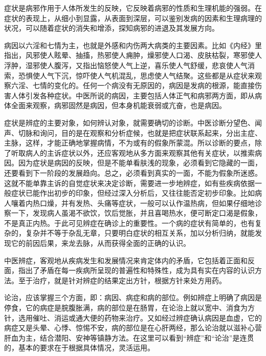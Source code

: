 \documentclass[12pt,UTF8]{ctexbook}
\begin{document}
症状是病邪作用于人体所发生的反映，它反映着病邪的性质和生理机能的强弱。在症状的表现上，从细小到显露，从表面到深层，可以鉴别发病的因素和生理病理的状况，可以随着症状的消失和增添，探知病邪的进退及其发展方向。

病因以六淫和七情为主，也就是外感和内伤两大病类的主要因素。比如《内经》里指出，风邪使人眩晕、抽搐，热邪使人痈肿，燥邪使人口渴、皮肤枯裂，寒邪使人浮肿，湿邪使人腹泻，又指出恼怒使人气上逆，喜乐使人气舒缓，悲哀使人气消索，恐惧使人气下沉，惊吓使人气机混乱，思虑使人气结聚。这些都是从症状来观察六淫、七情的变化的。任何一个病没有无原因的，病因是发病的根源，能直接伤害人体引发各种症状。中医所说的病因，主要包括人体正气和病邪两方面，即从病体全面来观察，病邪固然是病因，但本身机能衰弱或亢奋，也是病因。

症状是辨症的主要对象，如何辨认对象，就需要确切的诊断。中医诊断分望色、闻声、切脉和询问，目的是在观察和分析症候，也就是把症状联系起来，分出主症、主脉，这样，才能正确地掌握病情，不为或有的假象所蒙混。所以诊断的要点，除了听取病人的主诉症状以外，还应客观地从多方面来观察其他有关症状，以推索病因。因为症状是病因的反映，但是不能单看肤浅的现象，必须看到它隐藏的一面，还要看到下一阶段的发展趋向。总之，必须看到真实的一面，不能为假象所迷惑。这就不能单靠主诉的自觉症状来决定诊断，需要进一步地辨症，如有些疾病依据一般症状已能作出初步的印象，但经过深入分析后，又往往能否定初步印象。比如病人嚷着内热口燥，并有发热、头痛等症状，一般可以认作温热病，但如果仔细地诊察一下，发现病人虽渴不欲饮，饮后觉胀，并且喜喝热水，便可断定口渴是假象，不是真正内热。于此可见辨症在确诊上的重要性。一个病的症状有简单的，也有复杂的，复杂并不等于杂乱无章，只要明白症状的相互关系，加以分析归纳，就能发现它的前因后果，来龙去脉，从而获得全面的正确的认识。

中医辨症，客观地从疾病发生和发展情况来肯定体内的矛盾，它包括着正面和反面，指出了矛盾在每一疾病所呈现的普遍性和特殊性，成为具有实在内容的认识方法。至于治疗，就是针对辨症的结果定出方针，根据方针来处方用药。

论治，应该掌握三个方面，即：病因、病症和病的部位。例如辨症上明确了病因是停食，它的病症是脘腹胀满，病的部位是在肠胃，在论治上就以宽中、消食为方针，选用催吐、消运或通大便的药物来治疗。又如经过辨症确认病因是血虚，它的病症又是头晕、心悸、惊惕不安，病的部位是在心肝两经，那么论治就以滋补心营肝血为主，结合潜阳、安神等镇静方法。在这里可以看到“辨症”和“论治”是连贯的，基本的要求在于根据具体情况，灵活运用。
\end{document}
